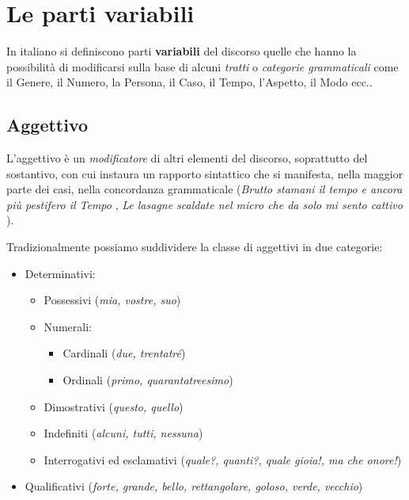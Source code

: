 \documentclass[a4paper,twoside,11pt,chapterprefix=false,bibliography=totocnumbered,listof=flat]{scrbook}
\providecommand{\tightlist}{%
  \setlength{\itemsep}{0pt}\setlength{\parskip}{0pt}}
\begin{document}
\hypertarget{le-parti-variabili}{%
\section{Le parti variabili}\label{le-parti-variabili}}

In italiano si definiscono parti \textbf{variabili} del discorso quelle
che hanno la possibilità di modificarsi sulla base di alcuni
\emph{tratti} o \emph{categorie grammaticali} \citep[ Cap.9]{simone1995}
come il Genere, il Numero, la Persona, il Caso, il Tempo, l'Aspetto, il
Modo ecc..

\hypertarget{aggettivo}{%
\subsection{Aggettivo}\label{aggettivo}}

L'aggettivo è un \emph{modificatore} di altri elementi del discorso,
soprattutto del sostantivo, con cui instaura un rapporto sintattico che
si manifesta, nella maggior parte dei casi, nella concordanza
grammaticale (\emph{Brutto stamani il tempo e ancora più pestifero il
Tempo} \citep{montale-satura}, \emph{Le lasagne scaldate nel micro che
da solo mi sento cattivo} \citep{fibra2017}).

Tradizionalmente possiamo suddividere la classe di aggettivi in due
categorie:

\begin{itemize}
\tightlist
\item
  Determinativi:

  \begin{itemize}
  \tightlist
  \item
    Possessivi (\emph{mia, vostre, suo})
  \item
    Numerali:

    \begin{itemize}
    \tightlist
    \item
      Cardinali (\emph{due, trentatré})
    \item
      Ordinali (\emph{primo, quarantatreesimo})
    \end{itemize}
  \item
    Dimostrativi (\emph{questo, quello})
  \item
    Indefiniti (\emph{alcuni, tutti, nessuna})
  \item
    Interrogativi ed esclamativi (\emph{quale?, quanti?, quale gioia!,
    ma che onore!})
  \end{itemize}
\item
  Qualificativi (\emph{forte, grande, bello, rettangolare, goloso,
  verde, vecchio})
\end{itemize}
\end{document}
